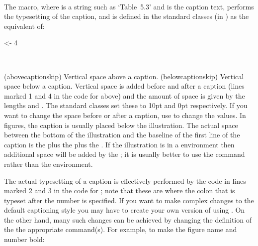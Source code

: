 \begin{syntax}
 \cmd{\@makecaption} \\
\end{syntax}
 The \cmd{\@makecaption} macro, where 
 is a string such as `Table~5.3' and  is the caption text,
 performs the typesetting of the caption, and
 is defined in the standard classes (in ) as the
 equivalent of:
\begin{lcode}
\newcommand{\@makecaption}[2]{
  \vskip\abovecaptionskip         <- 1
  \sbox\@tempboxa{#1: #2}         <- 2
  \ifdim \wd\@tempboxa >\hsize
    #1: #2\par                    <- 3
  \else
    \global \@minipagefalse
    \hb@xt@\hsize{\hfil\box\@tempboxa\hfil}
  \fi
  \vskip\belowcaptionskip}        <- 4
\end{lcode}

\begin{syntax}
 \lnc{\abovecaptionskip}
 \lnc{\belowcaptionskip} \\
\end{syntax}
\glossary(abovecaptionskip)%
  {}%
  {Vertical space above a caption.}
\glossary(belowcaptionskip)%
  {}%
  {Vertical space below a caption.}
  Vertical space is added before and after a caption (lines marked 1 and 4
in the code for \cmd{\@makecaption} above) and the amount of space is given
by the lengths \lnc{\abovecaptionskip} 
and \lnc{\belowcaptionskip}. The
standard classes set these to 10pt and 0pt respectively. If you want
to change the space before or after a caption, use \cmd{\setlength} to change
the values. In figures, the caption is usually placed below the
illustration. The actual space between the bottom 
of the illustration and the baseline of the first 
line of the caption is 
the \lnc{\abovecaptionskip} plus the 
\lnc{\parskip} plus the \lnc{\baselineskip}.
If the illustration is in a  environment 
then additional space will be added by the ; it is usually 
better to use the \cmd{\centering} command rather than the 
 environment.

 The actual typesetting of a caption is effectively performed by the code
in lines marked 2 and 3 in the code for \cmd{\@makecaption}; note that
these are where the colon that is typeset after the number is specified. 
If you want to
make complex changes to the default captioning style you may have to
create your own version of \cmd{\@caption} using 
\cmd{\renewcommand}. On the other hand, many such changes can be achieved
by changing the definition of the 
the appropriate \cmd{\fnum@type} command(s). For example, to make the 
figure name and number bold: 
\begin{lcode}
\renewcommand{\fnum@figure}{\textbf{\figurename~\thefigure}}
\end{lcode}

